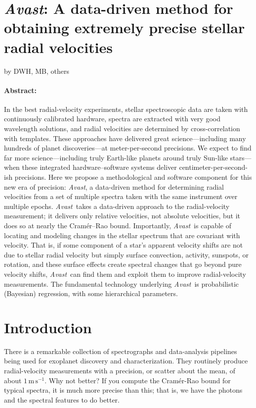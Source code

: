 \documentclass[12pt, letterpaper]{article}
\newcommand{\project}[1]{\textsl{#1}}
\newcommand{\Avast}{\project{A$\!$vast}}
\newcommand{\unit}[1]{\mathrm{#1}}
\newcommand{\m}{\unit{m}}
\newcommand{\s}{\unit{s}}
\newcommand{\mps}{\m\,\s^{-1}}
\begin{document}
\section*{\Avast: A data-driven method for obtaining extremely precise stellar radial velocities}

\noindent
by DWH, MB, others

\paragraph{Abstract:}
In the best radial-velocity experiments, stellar
spectroscopic data are taken with continuously calibrated hardware,
spectra are extracted with very good wavelength solutions, and radial
velocities are determined by cross-correlation with templates.
These approaches have delivered great science---including many
hundreds of planet discoveries---at meter-per-second precisions.
We expect to find far more science---including truly Earth-like
planets around truly Sun-like stars---when these integrated
hardware--software systems deliver centimeter-per-second-ish
precisions.
Here we propose a methodological and software component for this new
era of precision: \Avast, a data-driven method for determining
radial velocities from a set of multiple spectra taken with the same
instrument over multiple epochs.
\Avast\ takes a data-driven approach to the radial-velocity
measurement; it delivers only relative velocities, not absolute
velocities, but it does so at nearly the Cram\'er--Rao bound.
Importantly, \Avast\ is capable of locating and modeling changes in
the stellar spectrum that are covariant with velocity.
That is, if some component of a star's apparent velocity shifts are
not due to stellar radial velocity but simply surface convection,
activity, sunspots, or rotation, and these surface effects create
spectral changes that go beyond pure velocity shifts, \Avast\ can find
them and exploit them to improve radial-velocity measurements.
The fundamental technology underlying \Avast\ is probabilistic
(Bayesian) regression, with some hierarchical parameters.

\section{Introduction}

There is a remarkable collection of spectrographs and data-analysis
pipelines being used for exoplanet discovery and characterization.
They routinely produce radial-velocity measurements with a precision,
or scatter about the mean, of about $1\,\mps$.
Why not better?
If you compute the Cram\'er-Rao bound for typical spectra, it is much
more precise than this; that is, we have the photons and the spectral
features to do better.
\end{document}
